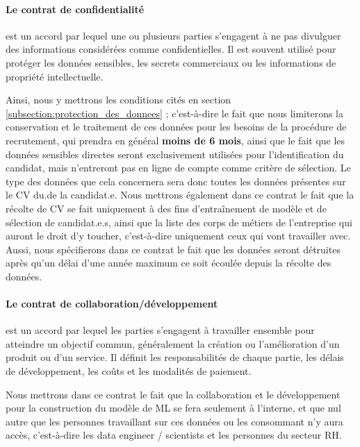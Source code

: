 \paragraph{Le contrat de confidentialité} est un accord par lequel une ou plusieurs parties s'engagent à ne pas divulguer des informations considérées comme confidentielles. Il est souvent utilisé pour protéger les données sensibles, les secrets commerciaux ou les informations de propriété intellectuelle.

Ainsi, nous y mettrons les conditions cités en section \ref{subsection:protection_des_donnees} ; c'est-à-dire le fait que nous limiterons la conservation et le traitement de ces données  pour les besoins de la procédure de recrutement, qui prendra en général \textbf{moins de 6 mois}, ainsi que le fait que les données sensibles directes seront exclusivement utilisées pour l'identification du candidat, mais n'entreront pas en ligne de compte comme critère de sélection. Le type des données que cela concernera sera donc toutes les données présentes sur le CV du.de la candidat.e. Nous mettrons également dans ce contrat le fait que la récolte de CV se fait uniquement à des fins d'entraînement de modèle et de sélection de candidat.e.s, ainsi que la liste des corps de métiers de l'entreprise qui auront le droit d'y toucher, c'est-à-dire uniquement ceux qui vont travailler avec. \newline
Aussi, nous spécifierons dans ce contrat le fait que les données seront détruites après qu'un délai d'une année maximum ce soit écoulée depuis la récolte des données.

\paragraph{Le contrat de collaboration/développement} est un accord par lequel les parties s'engagent à travailler ensemble pour atteindre un objectif commun, généralement la création ou l'amélioration d'un produit ou d'un service. Il définit les responsabilités de chaque partie, les délais de développement, les coûts et les modalités de paiement.

Nous mettrons dans ce contrat le fait que la collaboration et le développement pour la construction du modèle de ML se fera seulement à l'interne, et que nul autre que les personnes travaillant sur ces données ou les consommant n'y aura accès, c'est-à-dire les data engineer / scientists et les personnes du secteur RH.\newline

